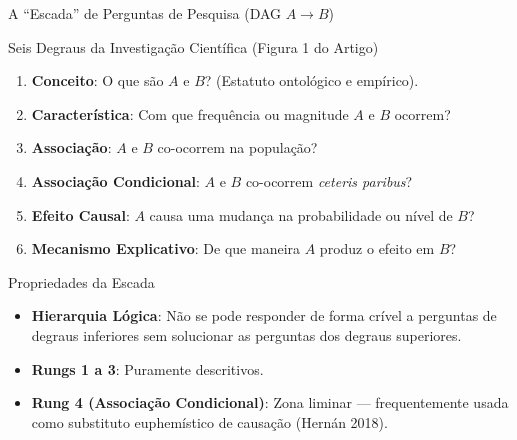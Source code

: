 \documentclass[
  ignorenonframetext,
  aspectratio=169,
  brazilian,
  t,
  10pt]{beamer}
\providecommand{\tightlist}{%
  \setlength{\itemsep}{0pt}\setlength{\parskip}{0pt}}
\begin{document}
\begin{frame}{A ``Escada'' de Perguntas de Pesquisa (DAG \(A \to B\))}
\protect{}\label{a-escada-de-perguntas-de-pesquisa-dag-a-to-b}
\begin{block}{Seis Degraus da Investigação Científica (Figura 1 do Artigo)}
\begin{enumerate}
  \item \textbf{Conceito}: O que são $A$ e $B$? (Estatuto ontológico e empírico).
  \item \textbf{Característica}: Com que frequência ou magnitude $A$ e $B$ ocorrem?
  \item \textbf{Associação}: $A$ e $B$ co-ocorrem na população?
  \item \textbf{Associação Condicional}: $A$ e $B$ co-ocorrem \textit{ceteris paribus}?
  \item \textbf{Efeito Causal}: $A$ causa uma mudança na probabilidade ou nível de $B$?
  \item \textbf{Mecanismo Explicativo}: De que maneira $A$ produz o efeito em $B$?
\end{enumerate}
\end{block}

\begin{block}{Propriedades da Escada}
\protect{}\label{propriedades-da-escada}
\begin{itemize}
\tightlist
\item
  \textbf{Hierarquia Lógica}: Não se pode responder de forma crível a
  perguntas de degraus inferiores sem solucionar as perguntas dos
  degraus superiores.
\item
  \textbf{Rungs 1 a 3}: Puramente descritivos.
\item
  \textbf{Rung 4 (Associação Condicional)}: Zona liminar ---
  frequentemente usada como substituto euphemístico de causação (Hernán
  2018).
\end{itemize}
\end{block}
\end{frame}
\end{document}
